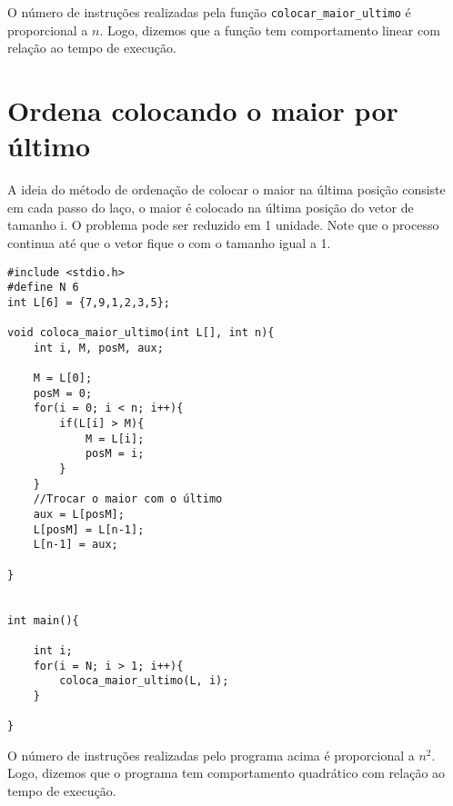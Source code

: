 \documentclass[a4paper,11pt]{article}
\begin{document}
O número de instruções realizadas pela função \texttt{colocar\_maior\_ultimo} é proporcional a $n$. Logo, dizemos que a função tem comportamento linear com relação ao tempo de execução.


\newpage

\section*{ Ordena colocando o maior por último}

A ideia do método de ordenação de colocar o maior na última posição consiste em cada passo do laço, o maior é colocado na última posição do vetor de tamanho i. O problema pode ser reduzido em 1 unidade. Note que o processo continua até que o vetor fique o com o tamanho igual a 1. 

\begin{verbatim}
#include <stdio.h>
#define N 6
int L[6] = {7,9,1,2,3,5}; 

void coloca_maior_ultimo(int L[], int n){
	int i, M, posM, aux;
	
	M = L[0];
	posM = 0;
	for(i = 0; i < n; i++){
		if(L[i] > M){
			M = L[i];
			posM = i;
		}
	}
	//Trocar o maior com o último
	aux = L[posM];
	L[posM] = L[n-1];
	L[n-1] = aux;

}


int main(){

    int i;
    for(i = N; i > 1; i++){
        coloca_maior_ultimo(L, i);
    }
		
}
\end{verbatim}

O número de instruções realizadas pelo programa acima é proporcional a $n^2$. Logo, dizemos que o programa tem comportamento quadrático com relação ao tempo de execução.
\end{document}
